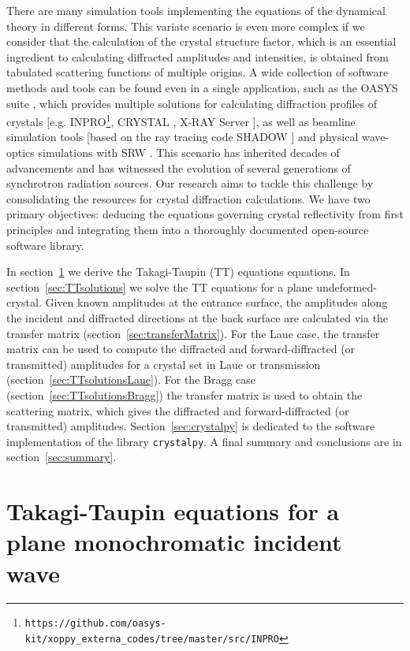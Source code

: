 \documentclass[preprint]{iucr}              %
\begin{document}
There are many simulation tools implementing the equations of the dynamical theory in different forms. This variate scenario is even more complex if we consider that the calculation of the crystal structure factor, which is an essential ingredient to calculating diffracted amplitudes and intensities, is obtained from tabulated scattering functions of multiple origins. A wide collection of software methods and tools can be found even in a single application, such as the OASYS suite \cite{codeOASYS}, which provides multiple solutions for calculating diffraction profiles of crystals [e.g. INPRO\footnote{\texttt{https://github.com/oasys-kit/xoppy\_externa\_codes/tree/master/src/INPRO}}, CRYSTAL \cite{codeCRYSTAL}, X-RAY Server \cite{codeXRAYserver}], as well as beamline simulation tools [based on the ray tracing code SHADOW \cite{codeSHADOW}] and physical wave-optics simulations with SRW \cite{codeSRW, codeSRWcrystals}.
This scenario has inherited decades of advancements and has witnessed the evolution of several generations of synchrotron radiation sources.
Our research aims to tackle this challenge by consolidating the resources for crystal diffraction calculations. We have two primary objectives: deducing the equations governing crystal reflectivity from first principles and integrating them into a thoroughly documented open-source software library.

In section~\ref{sec:TT} we derive the Takagi-Taupin (TT) equations \cite{Takagi1962, Taupin, Taupin1967} equations.
In section~\ref{sec:TTsolutions} we solve the TT equations for a plane undeformed-crystal.
Given known amplitudes at the entrance surface, the amplitudes along the incident and diffracted directions at the back surface are calculated via the transfer matrix (section~\ref{sec:transferMatrix}). For the Laue case, the transfer matrix can be used to compute the diffracted and forward-diffracted (or transmitted) amplitudes for a crystal set in Laue or transmission (section~\ref{sec:TTsolutionsLaue}). For the Bragg case (section~\ref{sec:TTsolutionsBragg}) the transfer matrix is used to obtain the scattering matrix, which gives the diffracted and forward-diffracted (or transmitted) amplitudes. 
Section~\ref{sec:crystalpy} is dedicated to the software implementation of the library \texttt{crystalpy}. A final summary and conclusions are in section~\ref{sec:summary}.
 
%
\section{Takagi-Taupin equations for a plane monochromatic incident wave}
\label{sec:TT}
\end{document}
